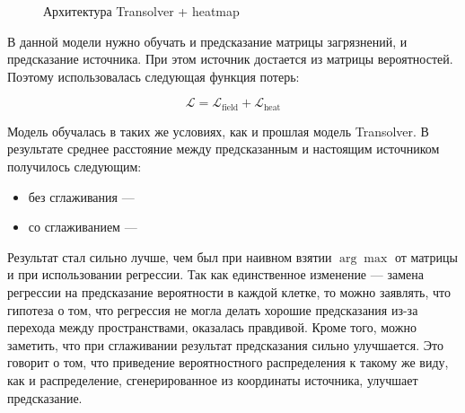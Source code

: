 \documentclass[12pt]{article}
\begin{document}
\begin{figure}[h]
    \centering
    \caption{Архитектура Transolver + heatmap}
    \label{fig:transolver_heatmap_arch}
\end{figure}

В данной модели нужно обучать и предсказание матрицы загрязнений, и предсказание источника. При этом источник достается из матрицы вероятностей. Поэтому использовалась следующая функция потерь:

$$
\mathcal{L} = \mathcal{L}_{\text{field}} + \mathcal{L}_{\text{heat}}
$$

Модель обучалась в таких же условиях, как и прошлая модель Transolver. В результате среднее расстояние между предсказанным и настоящим источником получилось следующим:

\begin{itemize}
    \item без сглаживания --- \textbf{\mHeatMean}
    \item со сглаживанием --- \textbf{\mHeatSmooth} 
\end{itemize}

Результат стал сильно лучше, чем был при наивном взятии $\arg\max$ от матрицы и при использовании регрессии. Так как единственное изменение --- замена регрессии на предсказание вероятности в каждой клетке, то можно заявлять, что гипотеза о том, что регрессия не могла делать хорошие предсказания из-за перехода между пространствами, оказалась правдивой.
Кроме того, можно заметить, что при сглаживании результат предсказания сильно улучшается. Это говорит о том, что приведение вероятностного распределения к такому же виду, как и распределение, сгенерированное из координаты источника, улучшает предсказание.
\end{document}
